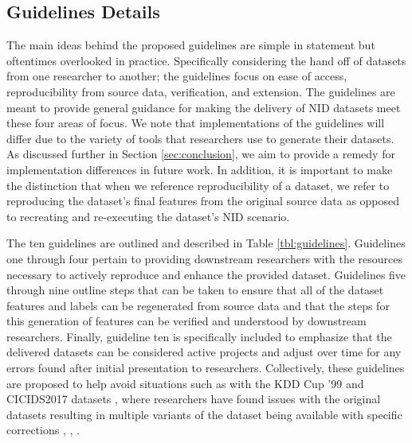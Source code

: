 \documentclass[sigconf]{acmart}
\begin{document}
\subsection{Guidelines Details}\label{subsec:framework_overview}
The main ideas behind the proposed guidelines are simple in statement but oftentimes overlooked in practice.
Specifically considering the hand off of datasets from one researcher to another; the guidelines focus on ease of access, reproducibility from source data, verification, and extension.
The guidelines are meant to provide general guidance for making the delivery of NID datasets meet these four areas of focus.
We note that implementations of the guidelines will differ due to the variety of tools that researchers use to generate their datasets.
As discussed further in Section \ref{sec:conclusion}, we aim to provide a remedy for implementation differences in future work.
In addition, it is important to make the distinction that when we reference reproducibility of a dataset, we refer to reproducing the dataset's final features from the original source data as opposed to recreating and re-executing the dataset's NID scenario.

The ten guidelines are outlined and described in Table \ref{tbl:guidelines}.
Guidelines one through four pertain to providing downstream researchers with the resources necessary to actively reproduce and enhance the provided dataset.
Guidelines five through nine outline steps that can be taken to ensure that all of the dataset features and labels can be regenerated from source data and that the steps for this generation of features can be verified and understood by downstream researchers.
Finally, guideline ten is specifically included to emphasize that the delivered datasets can be considered active projects and adjust over time for any errors found after initial presentation to researchers.
Collectively, these guidelines are proposed to help avoid situations such as with the KDD Cup '99 \cite{kdd99} and CICIDS2017 datasets \cite{sharafaldin2018toward}, where researchers have found issues with the original datasets resulting in multiple variants of the dataset being available with specific corrections \cite{tavallaee2009detailed}, \cite{lanvin:hal-03775466}, \cite{engelen2021}.
\end{document}
